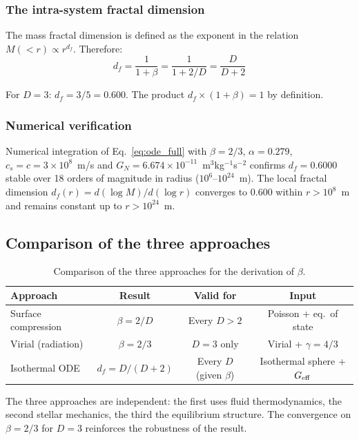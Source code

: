 \documentclass[10pt,a4paper]{article}
\begin{document}
\subsubsection{The intra-system fractal dimension}

The mass fractal dimension is defined as the exponent in the relation $M(<r) \propto r^{d_f}$. Therefore:
\begin{equation}\label{eq:df_result}
\boxed{d_f = \frac{1}{1+\beta} = \frac{1}{1+2/D} = \frac{D}{D+2}}
\end{equation}

For $D = 3$: $d_f = 3/5 = 0.600$. The product $d_f \times (1+\beta) = 1$ by definition.

\subsubsection{Numerical verification}

Numerical integration of Eq.~\ref{eq:ode_full} with $\beta = 2/3$, $\alpha = 0.279$, $c_s = c = 3 \times 10^8$~m/s and $G_N = 6.674 \times 10^{-11}$~m$^3$kg$^{-1}$s$^{-2}$ confirms $d_f = 0.6000$ stable over 18 orders of magnitude in radius ($10^6$--$10^{24}$~m). The local fractal dimension $d_f(r) = d(\log M)/d(\log r)$ converges to 0.600 within $r > 10^8$~m and remains constant up to $r > 10^{24}$~m.


\subsection{Comparison of the three approaches}

\begin{table}[h]
\centering
\caption{Comparison of the three approaches for the derivation of $\beta$.}\label{tab:approaches}
\begin{tabular}{lccc}
\toprule
Approach & Result & Valid for & Input \\
\midrule
Surface compression & $\beta = 2/D$ & Every $D > 2$ & Poisson + eq.\ of state \\
Virial (radiation) & $\beta = 2/3$ & $D = 3$ only & Virial + $\gamma = 4/3$ \\
Isothermal ODE & $d_f = D/(D+2)$ & Every $D$ (given $\beta$) & Isothermal sphere + $G_{\rm eff}$ \\
\bottomrule
\end{tabular}
\end{table}

The three approaches are independent: the first uses fluid thermodynamics, the second stellar mechanics, the third the equilibrium structure. The convergence on $\beta = 2/3$ for $D = 3$ reinforces the robustness of the result.
\end{document}
